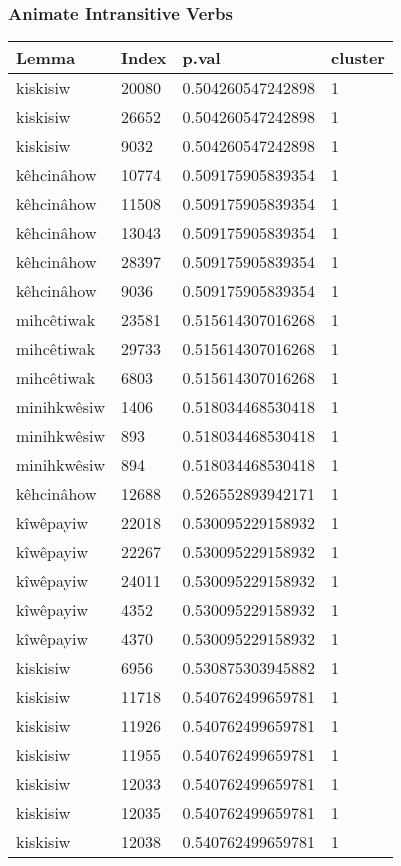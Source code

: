 \subsubsection{Animate Intransitive Verbs}
\begin{longtable}{llll}
\toprule
Lemma & Index & p.val & cluster \\
\midrule
kiskisiw & 20080 & 0.504260547242898 & 1 \\
kiskisiw & 26652 & 0.504260547242898 & 1 \\
kiskisiw & 9032 & 0.504260547242898 & 1 \\
kêhcinâhow & 10774 & 0.509175905839354 & 1 \\
kêhcinâhow & 11508 & 0.509175905839354 & 1 \\
kêhcinâhow & 13043 & 0.509175905839354 & 1 \\
kêhcinâhow & 28397 & 0.509175905839354 & 1 \\
kêhcinâhow & 9036 & 0.509175905839354 & 1 \\
mihcêtiwak & 23581 & 0.515614307016268 & 1 \\
mihcêtiwak & 29733 & 0.515614307016268 & 1 \\
mihcêtiwak & 6803 & 0.515614307016268 & 1 \\
minihkwêsiw & 1406 & 0.518034468530418 & 1 \\
minihkwêsiw & 893 & 0.518034468530418 & 1 \\
minihkwêsiw & 894 & 0.518034468530418 & 1 \\
kêhcinâhow & 12688 & 0.526552893942171 & 1 \\
kîwêpayiw & 22018 & 0.530095229158932 & 1 \\
kîwêpayiw & 22267 & 0.530095229158932 & 1 \\
kîwêpayiw & 24011 & 0.530095229158932 & 1 \\
kîwêpayiw & 4352 & 0.530095229158932 & 1 \\
kîwêpayiw & 4370 & 0.530095229158932 & 1 \\
kiskisiw & 6956 & 0.530875303945882 & 1 \\
kiskisiw & 11718 & 0.540762499659781 & 1 \\
kiskisiw & 11926 & 0.540762499659781 & 1 \\
kiskisiw & 11955 & 0.540762499659781 & 1 \\
kiskisiw & 12033 & 0.540762499659781 & 1 \\
kiskisiw & 12035 & 0.540762499659781 & 1 \\
kiskisiw & 12038 & 0.540762499659781 & 1 \\

\end{longtable}
